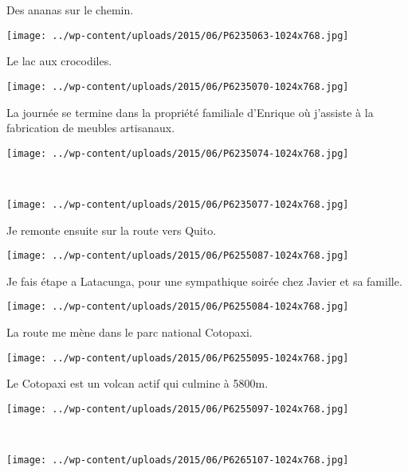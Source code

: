 Des ananas sur le chemin. 
\begin{center} 
\texttt{[image: ../wp-content/uploads/2015/06/P6235063-1024x768.jpg]} 
\end{center}
\vspace{-\topsep}
\pagebreak

Le lac aux crocodiles. 
\begin{center} 
\texttt{[image: ../wp-content/uploads/2015/06/P6235070-1024x768.jpg]} 
\end{center}

La journée se termine dans la propriété familiale d'Enrique où j'assiste à la fabrication de meubles artisanaux. 
\begin{center} 
\texttt{[image: ../wp-content/uploads/2015/06/P6235074-1024x768.jpg]} 
\end{center}
\vspace{-\topsep}
\pagebreak
~
\begin{center} 
\texttt{[image: ../wp-content/uploads/2015/06/P6235077-1024x768.jpg]} 
\end{center}

Je remonte ensuite sur la route vers Quito. \\
\begin{center} 
\texttt{[image: ../wp-content/uploads/2015/06/P6255087-1024x768.jpg]} 
\end{center}
\vspace{-\topsep}
\pagebreak

Je fais étape a Latacunga, pour une sympathique soirée chez Javier et sa famille. 
\begin{center} 
\texttt{[image: ../wp-content/uploads/2015/06/P6255084-1024x768.jpg]} 
\end{center}

La route me mène dans le parc national Cotopaxi. 
\begin{center} 
\texttt{[image: ../wp-content/uploads/2015/06/P6255095-1024x768.jpg]} 
\end{center}
\vspace{-\topsep}
\pagebreak

Le Cotopaxi est un volcan actif qui culmine à 5800m. \\
\begin{center} 
\texttt{[image: ../wp-content/uploads/2015/06/P6255097-1024x768.jpg]} 
\end{center}
~
\begin{center} 
\texttt{[image: ../wp-content/uploads/2015/06/P6265107-1024x768.jpg]} 
\end{center}
\vspace{-\topsep}
\pagebreak

